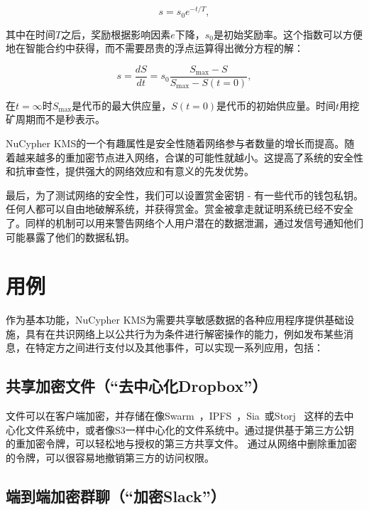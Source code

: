 \documentclass[longbibliography,nofootinbib]{revtex4-1}
\newcommand{\kms}{NuCypher KMS}
\begin{document}
\begin{equation}
    s = s_0 e^{-t/T},
\end{equation}

        其中在时间$T$之后，奖励根据影响因素$e$下降，$s_0$是初始奖励率。这个指数可以方便地在智能合约中获得，而不需要昂贵的浮点运算得出微分方程的解：
    
\begin{equation}
    s = \frac{dS}{dt}= s_0 \frac{S_{\max} - S}{S_{\max} - S(t=0)},
\end{equation}

        在$t=\infty$时$S_{\max}$是代币的最大供应量，$S(t=0)$是代币的初始供应量。时间$t$用挖矿周期而不是秒表示。

        \kms 的一个有趣属性是安全性随着网络参与者数量的增长而提高。随着越来越多的重加密节点进入网络，合谋的可能性就越小。这提高了系统的安全性和抗审查性，提供强大的网络效应和有意义的先发优势。
    
    最后，为了测试网络的安全性，我们可以设置赏金密钥 - 有一些代币的钱包私钥。任何人都可以自由地破解系统，并获得赏金。赏金被拿走就证明系统已经不安全了。同样的机制可以用来警告网络个人用户潜在的数据泄漏，通过发信号通知他们可能暴露了他们的数据私钥。


\section{用例}

        作为基本功能，\kms 为需要共享敏感数据的各种应用程序提供基础设施，具有在共识网络上以公共行为为条件进行解密操作的能力，例如发布某些消息，在特定方之间进行支付以及其他事件，可以实现一系列应用，包括：

\subsection{共享加密文件（“去中心化Dropbox”）}
\label{sec:files}

        文件可以在客户端加密，并存储在像Swarm~\cite{swarm}，IPFS~\cite{whitepaper:ipfs}，Sia~\cite{web:sia}或Storj ~\cite{web:storj}这样的去中心化文件系统中，或者像S3一样中心化的文件系统中。通过提供基于第三方公钥的重加密令牌，可以轻松地与授权的第三方共享文件。 通过从网络中删除重加密的令牌，可以很容易地撤销第三方的访问权限。

\subsection{端到端加密群聊（“加密Slack”）}
\end{document}
